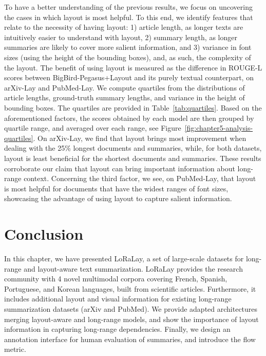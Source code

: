To have a better understanding of the previous results, we focus on uncovering the cases in which layout is most helpful. To this end, we identify features that relate to the necessity of having layout: 1) article length, as longer texts are intuitively easier to understand with layout, 2) summary length, as longer summaries are likely to cover more salient information, and 3) variance in font sizes (using the height of the bounding boxes), and, as such, the complexity of the layout.
The benefit of using layout is measured as the difference in ROUGE-L scores between BigBird-Pegasus+Layout and its purely textual counterpart, on arXiv-Lay and PubMed-Lay. We compute quartiles from the distributions of article lengths, ground-truth summary lengths, and variance in the height of bounding boxes. The quartiles are provided in Table~\ref{tab:quartiles}. Based on the aforementioned factors, the scores obtained by each model are then grouped by quartile range, and averaged over each range, see Figure~\ref{fig:chapter5-analysis-quartiles}. On arXiv-Lay, we find that layout brings most improvement when dealing with the 25\% longest documents and summaries, while, for both datasets, layout is least beneficial for the shortest documents and summaries. These results corroborate our claim that layout can bring important information about long-range context. Concerning the third factor, we see, on PubMed-Lay, that layout is most helpful for documents that have the widest ranges of font sizes, showcasing the advantage of using layout to capture salient information. 

\section{Conclusion}

In this chapter, we have presented LoRaLay, a set of large-scale datasets for long-range and layout-aware text summarization. LoRaLay provides the research community with 4 novel multimodal corpora covering French, Spanish, Portuguese, and Korean languages, built from scientific articles. Furthermore, it includes additional layout and visual information for existing long-range summarization datasets (arXiv and PubMed). We provide adapted architectures merging layout-aware and long-range models, and show the importance of layout information in capturing long-range dependencies. Finally, we design an annotation interface for human evaluation of summaries, and introduce the flow metric.